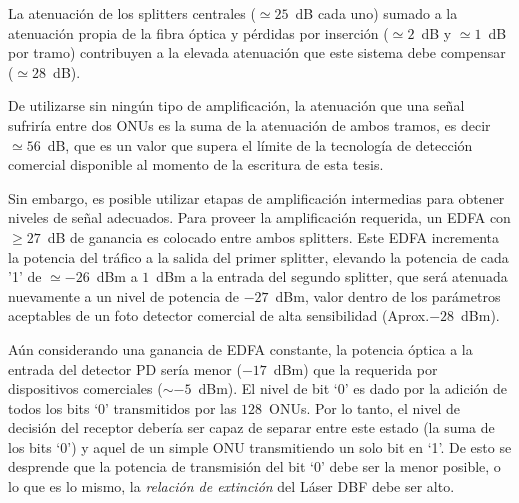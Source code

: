 La atenuación de los splitters centrales ($\simeq25$~dB cada uno) sumado a la atenuación propia de la fibra óptica y pérdidas por inserción ($\simeq2$~dB y $\simeq1$~dB por tramo) contribuyen a la elevada atenuación que este sistema debe compensar ($\simeq28$~dB).

De utilizarse sin ningún tipo de amplificación, la atenuación que una señal sufriría entre dos ONUs es la suma de la atenuación de ambos tramos, es decir $\simeq56$~dB, que es un valor que supera el límite de la tecnología de detección comercial disponible al momento de la escritura de esta tesis.

Sin embargo, es posible utilizar etapas de amplificación intermedias para obtener niveles de señal adecuados. Para proveer la amplificación requerida, un EDFA con $\geq27$~dB de ganancia es colocado entre ambos splitters. Este EDFA incrementa la potencia del tráfico a la salida del primer splitter, elevando la potencia de cada '1' de $\simeq-26$~dBm a $1$~dBm a la entrada del segundo splitter, que será atenuada nuevamente a un nivel de potencia de $-27$~dBm, valor dentro de los parámetros aceptables de un foto detector comercial de alta sensibilidad (Aprox.$-28$~dBm).


Aún considerando una ganancia de EDFA constante, la potencia óptica a la entrada del detector PD sería menor ($-17$~dBm) que la requerida por dispositivos comerciales ($\sim -5$~dBm).
El nivel de bit `0' es dado por la adición de todos los bits `0' transmitidos por las $128$~ONUs. Por lo tanto, el nivel de decisión del receptor debería ser capaz de separar entre este estado (la suma de los bits `0') y aquel de un simple ONU transmitiendo un solo bit en `1'.
De esto se desprende que la potencia de transmisión del bit `0' debe ser la menor posible, o lo que es lo mismo, la \textit{relación de extinción} del Láser DBF debe ser alto.

